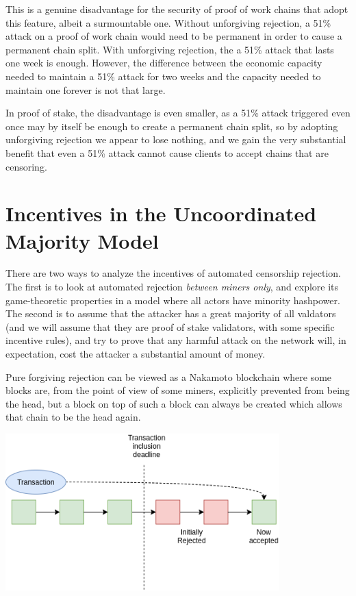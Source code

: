 \documentclass[12pt]{article}
\begin{document}
This is a genuine disadvantage for the security of proof of work chains that adopt this feature, albeit a surmountable one. Without unforgiving rejection, a 51\% attack on a proof of work chain would need to be permanent in order to cause a permanent chain split. With unforgiving rejection, the a 51\% attack that lasts one week is enough. However, the difference between the economic capacity needed to maintain a 51\% attack for two weeks and the capacity needed to maintain one forever is not that large.

In proof of stake, the disadvantage is even smaller, as a 51\% attack triggered even once may by itself be enough to create a permanent chain split, so by adopting unforgiving rejection we appear to lose nothing, and we gain the very substantial benefit that even a 51\% attack cannot cause clients to accept chains that are censoring.

\section{Incentives in the Uncoordinated Majority Model}

There are two ways to analyze the incentives of automated censorship rejection. The first is to look at automated rejection \textit{between miners only}, and explore its game-theoretic properties in a model where all actors have minority hashpower. The second is to assume that the attacker has a great majority of all valdators (and we will assume that they are proof of stake validators, with some specific incentive rules), and try to prove that any harmful attack on the network will, in expectation, cost the attacker a substantial amount of money.

Pure forgiving rejection can be viewed as a Nakamoto blockchain where some blocks are, from the point of view of some miners, explicitly prevented from being the head, but a block on top of such a block can always be created which allows that chain to be the head again.

\includegraphics[width=400px]{Censorship3p5.png}
\end{document}
